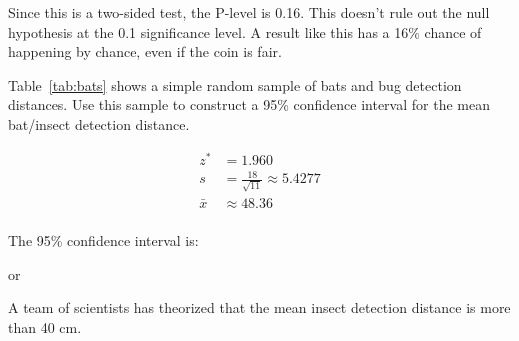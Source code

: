 \documentclass[landscape]{exam}
\begin{document}
\begin{questions}
\begin{solution}
        Since this is a two-sided test, the P-level is 0.16. This doesn't
        rule out the null hypothesis at the 0.1 significance level. A result
        like this has a 16\% chance of happening by chance, even if the coin is
        fair.

      \end{solution}



    \question[10]\label{q:bats_first}
      Table~\ref{tab:bats} shows a simple random sample of bats and bug
      detection distances.  Use this sample to construct a 95\% confidence
      interval for the mean bat/insect detection distance.

      \begin{solution}
        \begin{align*}
          z^*     & = 1.960 \\
          s       & = \frac{18}{\sqrt{11}} \approx 5.4277 \\
          \bar{x} & \approx 48.36 \\
        \end{align*}

        The 95\% confidence interval is: 
        
         or 

      \end{solution}
    \question{}
      A team of scientists has theorized that the mean insect detection distance
      is more than 40 cm. 


\end{questions}
\end{document}
